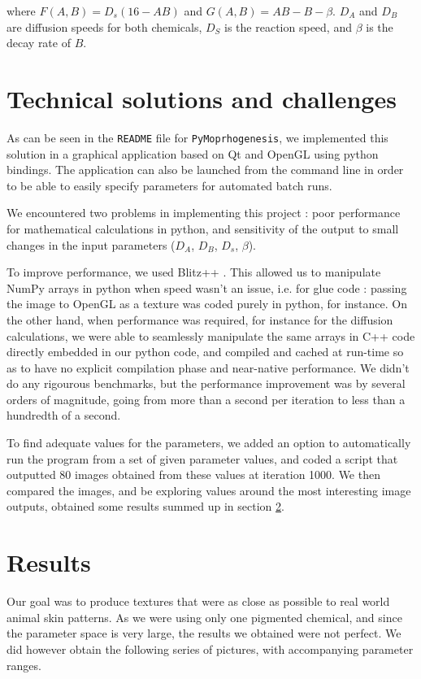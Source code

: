 \documentclass[a4paper,11pt]{article}
\begin{document}
where $F(A, B) = D_s (16 - A B)$ and $G(A, B) = A B - B - \beta$. $D_A$ and
$D_B$ are diffusion speeds for both chemicals, $D_S$ is the reaction speed,
and $\beta$ is the decay rate of $B$.

\section{Technical solutions and challenges}

As can be seen in the \verb|README| file for \verb|PyMoprhogenesis|, we
implemented this solution in a graphical application based on Qt and OpenGL
using python bindings. The application can also be launched from the command
line in order to be able to easily specify parameters for automated batch
runs.

We encountered two problems in implementing this project : poor performance
for mathematical calculations in python, and sensitivity of the output to
small changes in the input parameters ($D_A$, $D_B$, $D_s$, $\beta$).

To improve performance, we used Blitz++ \cite{weave} \cite{performancepython}.
This allowed us to manipulate NumPy arrays in python when speed wasn't an
issue, i.e. for glue code : passing the image to OpenGL as a texture was coded
purely in python, for instance. On the other hand, when performance was
required, for instance for the diffusion calculations, we were able to
seamlessly manipulate the same arrays in C++ code directly embedded in our
python code, and compiled and cached at run-time so as to have no explicit
compilation phase and near-native performance. We didn't do any rigourous
benchmarks, but the performance improvement was by several orders of
magnitude, going from more than a second per iteration to less than a
hundredth of a second.

To find adequate values for the parameters, we added an option to
automatically run the program from a set of given parameter values, and coded
a script that outputted 80 images obtained from these values at iteration
1000. We then compared the images, and be exploring values around the most
interesting image outputs, obtained some results summed up in section
\ref{sec:results}.

\section{Results} %
\label{sec:results}

Our goal was to produce textures that were as close as possible to real world
animal skin patterns. As we were using only one pigmented chemical, and since
the parameter space is very large, the results we obtained were not perfect.
We did however obtain the following series of pictures, with accompanying
parameter ranges.
\end{document}
